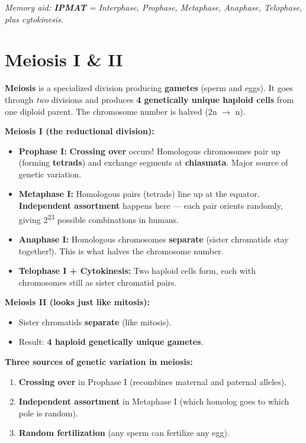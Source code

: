 \documentclass[11pt, letterpaper]{article}
\begin{document}
\textit{Memory aid: \textbf{IPMAT} = Interphase, Prophase, Metaphase, Anaphase, Telophase, plus cytokinesis.}

\section*{Meiosis I \& II}

\textbf{Meiosis} is a specialized division producing \textbf{gametes} (sperm and eggs). It
goes through \emph{two} divisions and produces \textbf{4 genetically unique haploid cells}
from one diploid parent. The chromosome number is halved (2n $\to$ n).

\textbf{Meiosis I (the reductional division):}
\begin{itemize}[noitemsep]
  \item \textbf{Prophase I:} \textbf{Crossing over} occurs! Homologous chromosomes pair up (forming \textbf{tetrads}) and exchange segments at \textbf{chiasmata}. Major source of genetic variation.
  \item \textbf{Metaphase I:} Homologous pairs (tetrads) line up at the equator. \textbf{Independent assortment} happens here --- each pair orients randomly, giving 2\textsuperscript{23} possible combinations in humans.
  \item \textbf{Anaphase I:} Homologous chromosomes \textbf{separate} (sister chromatids stay together!). This is what halves the chromosome number.
  \item \textbf{Telophase I + Cytokinesis:} Two haploid cells form, each with chromosomes still as sister chromatid pairs.
\end{itemize}

\textbf{Meiosis II (looks just like mitosis):}
\begin{itemize}[noitemsep]
  \item Sister chromatids \textbf{separate} (like mitosis). 
  \item Result: \textbf{4 haploid genetically unique gametes}.
\end{itemize}

\textbf{Three sources of genetic variation in meiosis:}
\begin{enumerate}[noitemsep]
  \item \textbf{Crossing over} in Prophase I (recombines maternal and paternal alleles).
  \item \textbf{Independent assortment} in Metaphase I (which homolog goes to which pole is random).
  \item \textbf{Random fertilization} (any sperm can fertilize any egg).
\end{enumerate}
\end{document}
